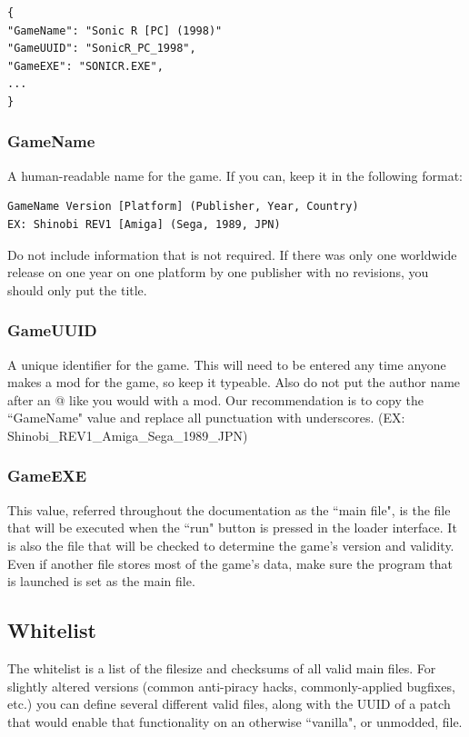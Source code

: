 \documentclass[12pt,a4paper,notitlepage]{article}
\begin{document}
\begin{lstlisting}[breaklines=true]
{
"GameName": "Sonic R [PC] (1998)"
"GameUUID": "SonicR_PC_1998",
"GameEXE": "SONICR.EXE",
...
}
\end{lstlisting}

\subsubsection{GameName}
A human-readable name for the game. If you can, keep it in the following format:

\begin{lstlisting}[breaklines=true]
GameName Version [Platform] (Publisher, Year, Country)
EX: Shinobi REV1 [Amiga] (Sega, 1989, JPN)
\end{lstlisting}

Do not include information that is not required. If there was only one worldwide release on one year on one platform by one publisher with no revisions, you should only put the title.

\subsubsection{GameUUID}
A unique identifier for the game. This will need to be entered any time anyone makes a mod for the game, so keep it typeable. Also do not put the author name after an @ like you would with a mod. Our recommendation is to copy the ``GameName" value and replace all punctuation with underscores. (EX: Shinobi\_REV1\_Amiga\_Sega\_1989\_JPN)

\subsubsection{GameEXE}
This value, referred throughout the documentation as the ``main file", is the file that will be executed when the ``run" button is pressed in the loader interface. It is also the file that will be checked to determine the game's version and validity. Even if another file stores most of the game's data, make sure the program that is launched is set as the main file.

\subsection{Whitelist}
The whitelist is a list of the filesize and checksums of all valid main files. For slightly altered versions (common anti-piracy hacks, commonly-applied bugfixes, etc.) you can define several different valid files, along with the UUID of a patch that would enable that functionality on an otherwise ``vanilla", or unmodded, file.
\end{document}
